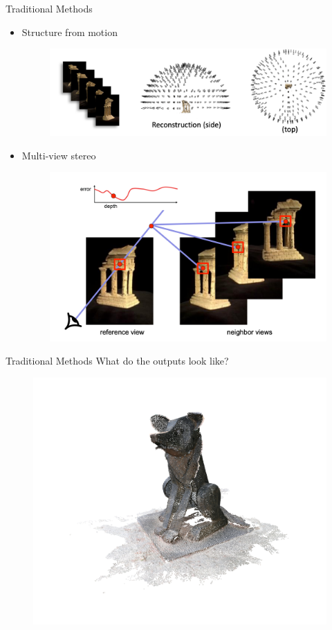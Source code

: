 \documentclass[10pt]{beamer}
\begin{document}
{
\begin{frame}{Traditional Methods}
    \begin{itemize}
        \item Structure from motion
        \begin{figure}
            \centering
            \includegraphics[width=0.7\linewidth]{figures/intro/sfm.png}
        \end{figure}
        \item Multi-view stereo
        \begin{figure}
            \centering
            \includegraphics[width=0.6\linewidth]{figures/intro/mvs.png}
        \end{figure}
    \end{itemize}
\end{frame}
}


\begin{frame}{Traditional Methods}
    What do the outputs look like?
    
    \begin{figure}
        \centering
        \includegraphics[width=0.8\linewidth]{figures/intro/point_cloud.png}
    \end{figure}
\end{frame}
\end{document}
